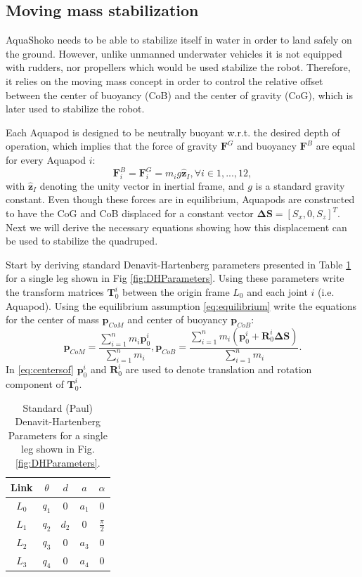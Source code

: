 \subsection{Moving mass stabilization}\label{sec:stable}
AquaShoko needs to be able to stabilize itself in water in order to land safely on the ground. However, unlike unmanned underwater vehicles it is not equipped with rudders, nor propellers which would be used stabilize the robot. Therefore, it relies on the moving mass concept in order to control the relative offset between the center of buoyancy (CoB) and the center of gravity (CoG), which is later used to stabilize the robot.

Each Aquapod is designed to be neutrally buoyant w.r.t. the desired depth of operation, which implies that the force of gravity $\textbf{F}^G$ and buoyancy $\textbf{F}^B$ are equal for every Aquapod $i$:
\begin{equation}\label{eq:equilibrium}
\textbf{F}^B_i=\textbf{F}^G_i=m_i g \hat{\textbf{z}}_I, \forall i \in 1,...,12,
\end{equation}
with $\hat{\textbf{z}}_I$ denoting the unity vector in inertial frame, and $g$ is a standard gravity constant. Even though these forces are in equilibrium, Aquapods are constructed to have the CoG and CoB displaced for a constant vector $\boldsymbol{\Delta}\textbf{S}=[S_x, 0, S_z]^T$. Next we will derive the necessary equations showing how this displacement can be used to stabilize the quadruped.

Start by deriving standard Denavit-Hartenberg parameters presented in Table \ref{tab:DHParameters} for a single leg shown in Fig \ref{fig:DHParameters}. Using these parameters write the transform matrices $\textbf{T}_0^i$ between the origin frame $L_0$ and each joint $i$ (i.e. Aquapod). Using the equilibrium assumption \eqref{eq:equilibrium} write the equations for the center of mass $\textbf{p}_{CoM}$ and center of buoyancy $\textbf{p}_{CoB}$:
\begin{equation}\label{eq:centersof}
\textbf{p}_{CoM} = \frac{\sum_{i=1}^n m_i \textbf{p}_0^i}{\sum_{i=1}^n m_i},\textbf{p}_{CoB} = \frac{\sum_{i=1}^n m_i( \textbf{p}_0^i+\textbf{R}_0^i \boldsymbol{\Delta}\textbf{S})}{\sum_{i=1}^n m_i}.
\end{equation} 
In \eqref{eq:centersof}  $\textbf{p}_0^i$ and $\textbf{R}_0^i$ are used to denote translation and rotation component of $\textbf{T}_0^i$.

\begin{table}[!t]
	\centering
	\caption{{Standard (Paul)} Denavit-Hartenberg Parameters for a single leg shown in Fig. \ref{fig:DHParameters}.}\label{tab:DHParameters}
	\begin{tabular}{ccccc}
		Link & $\theta$ & $d$ & $a$ & $\alpha$ \\\hline
		$L_0$ & $q_1$ & $0$ & $a_1$ & $0$\\
		$L_1$ & $q_2$ & $d_2$ & $0$ & $\frac{\pi}{2}$\\
		$L_2$ & $q_3$ & $0$ & $a_3$ & $0$\\
		$L_3$ & $q_4$ & $0$ & $a_4$ & $0$
	\end{tabular}
\end{table}

